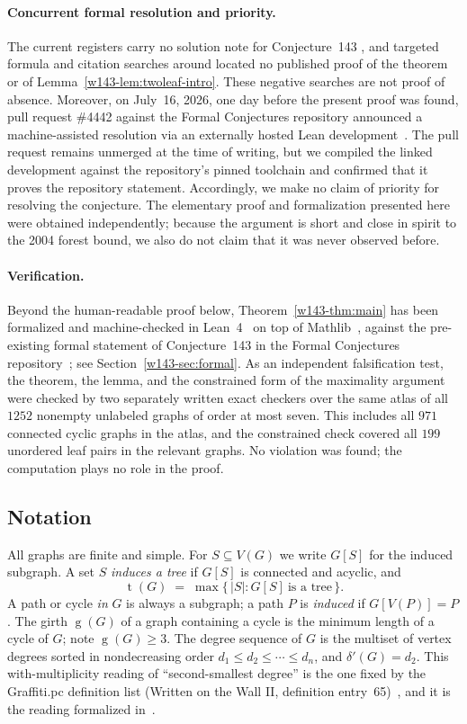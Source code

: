 \documentclass[11pt]{article}
\numberwithin{equation}{section}
\theoremstyle{remark}
\newcommand{\tr}{\operatorname{t}}
\newcommand{\gr}{\operatorname{g}}
\newcommand{\dd}{\delta'}
\begin{document}
\paragraph{Concurrent formal resolution and priority.}
The current registers carry no solution note for Conjecture~143
\cite{WestReg,FC143}, and targeted formula and citation searches around
\cite{ESS86,DW04,HMS14} located no published proof of the theorem or of
Lemma~\ref{w143-lem:twoleaf-intro}.  These negative searches are not proof of
absence.  Moreover, on July~16, 2026, one day before the present proof was
found, pull request \#4442 against the Formal Conjectures repository
announced a machine-assisted resolution via an externally hosted Lean
development~\cite{FC4442}.  The pull request remains unmerged at the time of
writing, but we compiled the linked development against the repository's
pinned toolchain and confirmed that it proves the repository statement.
Accordingly, we make no claim of priority for resolving the conjecture.  The
elementary proof and formalization presented here were obtained independently;
because the argument is short and close in spirit to the 2004 forest bound,
we also do not claim that it was never observed before.

\paragraph{Verification.}
Beyond the human-readable proof below, Theorem~\ref{w143-thm:main} has been
formalized and machine-checked in Lean~4~\cite{Lean4} on top of
Mathlib~\cite{mathlib}, against the pre-existing formal statement of
Conjecture~143 in the Formal Conjectures repository~\cite{FC143}; see
Section~\ref{w143-sec:formal}.  As an independent falsification test, the theorem,
the lemma, and the constrained form of the maximality argument were checked by
two separately written exact checkers over the same atlas of all $1252$ nonempty unlabeled graphs of
order at most seven.  This includes all $971$ connected cyclic graphs in the
atlas, and the constrained check covered all $199$ unordered leaf pairs in
the relevant graphs.  No violation was found; the computation plays no role
in the proof.

\subsection{Notation}

All graphs are finite and simple.  For $S\subseteq V(G)$ we write $G[S]$ for
the induced subgraph.  A set $S$ \emph{induces a tree} if $G[S]$ is connected
and acyclic, and
\[
  \tr(G)\;=\;\max\{\,|S| : G[S]\ \text{is a tree}\,\}.
\]
A path or cycle \emph{in} $G$ is always a subgraph; a path $P$ is
\emph{induced} if $G[V(P)]=P$.  The girth $\gr(G)$ of a graph containing a
cycle is the minimum length of a cycle of $G$; note $\gr(G)\ge3$.  The degree
sequence of $G$ is the multiset of vertex degrees sorted in nondecreasing
order $d_1\le d_2\le\cdots\le d_n$, and $\dd(G)=d_2$.  This with-multiplicity
reading of ``second-smallest degree'' is the one fixed by the Graffiti.pc
definition list (Written on the Wall II, definition entry~65)~\cite{WOWII},
and it is the reading formalized in~\cite{FC143}.
\end{document}
